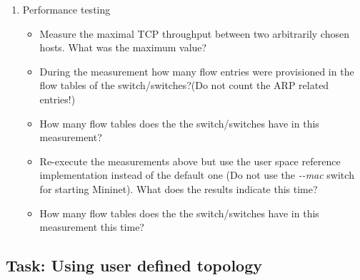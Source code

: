 \documentclass[a4paper]{article}
\begin{document}
\begin{enumerate}
    \item Performance testing
          \begin{itemize}
              \item Measure the maximal TCP throughput between two arbitrarily chosen hosts. What was the maximum
                    value?
              \item During the measurement how many flow entries were provisioned in the flow tables of the
                    switch/switches?(Do
                    not count the ARP related entries!)
              \item How many flow tables does the the switch/switches have in this measurement?
              \item Re-execute the measurements above but use the user space reference implementation instead of the
                    default one
                    (Do not use the \emph{-{}-mac} switch for starting Mininet). What does the results indicate this
                    time?
              \item How many flow tables does the the switch/switches have in this measurement this time?
          \end{itemize}

\end{enumerate}

\subsection{Task: Using user defined topology} \label{task:UDT}
\end{document}
